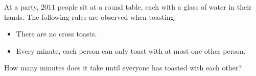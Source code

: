 At a party, $2011$ people sit at a round table, each with a glass of water in their hands.
The following rules are observed when toasting:
\begin{itemize}
    \item There are no cross toasts.
    \item Every minute, each person can only toast with at most one other person.
\end{itemize}
How many minutes does it take until everyone has toasted with each other?
